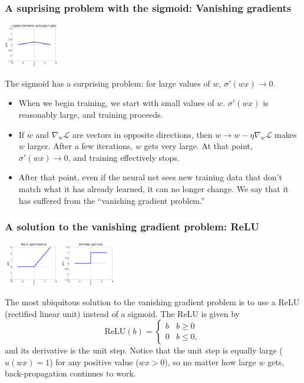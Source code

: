 \documentclass{beamer}
\begin{document}
\begin{frame}
  \frametitle{A suprising problem with the sigmoid: Vanishing gradients}
  \centerline{\includegraphics[width=1in]{../lec07/figs/nn_logisticprime.png}}
  
  The sigmoid has a surprising problem: for large values of $w$,
  $\sigma'(wx)\rightarrow 0$.
  \begin{itemize}
  \item When we begin training, we start with small values of $w$.
    $\sigma'(wx)$ is reasonably large, and training proceeds.
  \item If $w$ and $\nabla_{w}{\mathcal L}$ are vectors in opposite
    directions, then $w\rightarrow w-\eta\nabla_{w}{\mathcal L}$ makes
    $w$ larger.  After a few iterations, $w$ gets very large.  At that
    point, $\sigma'(wx)\rightarrow 0$, and training effectively stops.
  \item After that point, even if the neural net sees new training
    data that don't match what it has already learned, it can no
    longer change.  We say that it has suffered from the ``vanishing
    gradient problem.''
  \end{itemize}
\end{frame}
    
\begin{frame}
  \frametitle{A solution to the vanishing gradient problem: ReLU}
  \centerline{\includegraphics[width=1in]{../lec07/figs/nn_relu.png}\includegraphics[width=1in]{../lec07/figs/nn_unitstep.png}}

  The most ubiquitous solution to the vanishing gradient problem is to
  use a ReLU (rectified linear unit) instead of a sigmoid.  The ReLU
  is given by
  \[
  \mbox{ReLU}(b) = \begin{cases}
    b & b\ge 0\\
    0 & b\le 0,
  \end{cases}
  \]
  and its derivative is the unit step.  Notice that the
  unit step is equally large ($u(wx)=1$)  for any positive value ($wx>0$), so
  no matter how large $w$ gets, back-propagation continues to work.
\end{frame}
\end{document}
